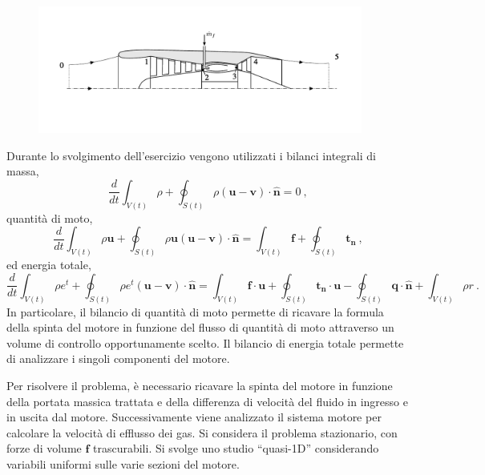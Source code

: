 \begin{figure}[h!]
 \centering
 \includegraphics[width=0.95\textwidth]{./fig/jet_engine}
\end{figure}

\sol

\partone
Durante lo svolgimento dell'esercizio vengono utilizzati i bilanci integrali di massa,
\begin{equation}
 \dfrac{d}{dt} \displaystyle\int_{V(t)} \rho + \oint_{S(t)} \rho (\bm{u}-\bm{v}) \cdot \bm{\hat{n}} = 0 \ ,
\end{equation}
quantità di moto,
\begin{equation}
 \dfrac{d}{dt} \displaystyle\int_{V(t)} \rho \bm{u} + \oint_{S(t)} \rho \bm{u} (\bm{u}-\bm{v}) \cdot \bm{\hat{n}}= \int_{V(t)} \bm{f} + \oint_{S(t)} \bm{t_n} \ ,
\end{equation}
ed energia totale,
\begin{equation}
 \dfrac{d}{dt} \displaystyle\int_{V(t)} \rho e^t + \oint_{S(t)} \rho e^t (\bm{u}-\bm{v}) \cdot \bm{\hat{n}}= \int_{V(t)} \bm{f} \cdot \bm{u} + \oint_{S(t)} \bm{t_n} \cdot \bm{u} - \oint_{S(t)} \bm{q} \cdot \bm{\hat{n}} + \int_{V(t)} \rho r \ .
\end{equation}
In particolare, il bilancio di quantità di moto permette di ricavare la formula della spinta del motore in funzione del flusso di quantità di moto attraverso un volume di controllo opportunamente scelto. Il bilancio di energia totale permette di analizzare i singoli componenti del motore. 

\vspace{0.5cm}
\parttwo
Per risolvere il problema, è necessario ricavare la spinta del motore in funzione della portata massica trattata e della differenza di velocità del fluido in ingresso e in uscita dal motore. Successivamente viene analizzato il sistema motore per calcolare la velocità di efflusso dei gas. Si considera il problema stazionario, con forze di volume $\bm{f}$ trascurabili. Si svolge uno studio ``quasi-1D'' considerando variabili uniformi sulle varie sezioni del motore.
%
